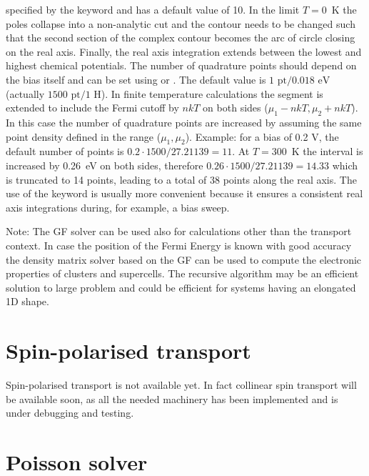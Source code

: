 specified by the keyword  and has a default value of 10.  In the
limit $T=0$~K the poles collapse into a non-analytic cut and the contour needs
to be changed such that the second section of the complex contour becomes the
arc of circle closing on the real axis.  Finally, the real axis integration
extends between the lowest and highest chemical potentials. The number of
quadrature points should depend on the bias itself and can be set using
 or . The default value is
$1\text{~pt}/0.018\text{~eV}$ (actually $1500\text{~pt}/1\text{~H}$). In finite
temperature calculations the segment is extended to include the Fermi cutoff by
$nkT$ on both sides ($\mu_1-nkT, \mu_2+nkT$). In this case the number of
quadrature points are increased by assuming the same point density defined in
the range ($\mu_1, \mu_2$).  Example: for a bias of 0.2 V, the default number of
points is $0.2\cdot1500/27.21139=11$. At $T=300$~K the interval is increased by
0.26~eV on both sides, therefore $0.26\cdot1500/27.21139=14.33$ which is
truncated to 14 points, leading to a total of 38 points along the real axis. The
use of the keyword  is usually more convenient because it
ensures a consistent real axis integrations during, for example, a bias sweep.

Note: The GF solver can be used also for calculations other than the transport
context. In case the position of the Fermi Energy is known with good accuracy
the density matrix solver based on the GF can be used to compute the electronic
properties of clusters and supercells. The recursive algorithm may be an
efficient solution to large problem and could be efficient for systems having an
elongated 1D shape.

\section{Spin-polarised transport}

Spin-polarised transport is not available yet. In fact collinear spin transport will be available
soon, as all the needed machinery has been implemented and is under debugging and testing.



\section{Poisson solver}

